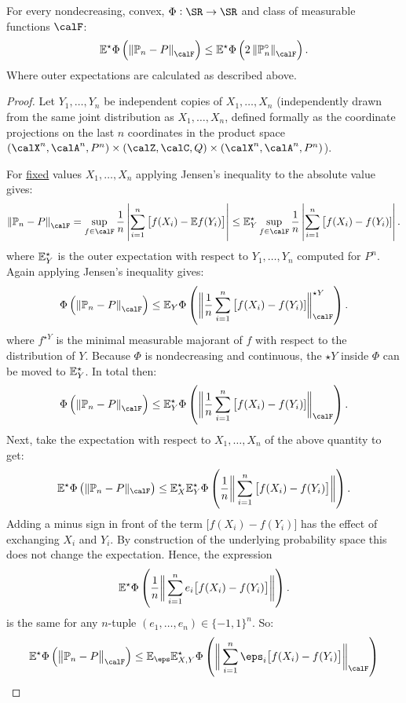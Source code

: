 \begin{lemma}[Symmetrization]
	\label{lemma:vdv2.3.1}
	For every nondecreasing, convex, \(\Phi:\SR\to\SR\) and class of measurable functions \(\calF\):
	\[
	    \E^\star\Phi\left(\left\|\P_n-P\right\|_\calF\right)\leq \E^\star\Phi\left(2\left\|\P_n^\circ\right\|_\calF\right)
	.\]
	Where outer expectations are calculated as described above.
\end{lemma}
\begin{proof}
	Let \(Y_1,\dots,Y_n\) be independent copies of \(X_1,\dots,X_n\) (independently drawn from the same joint distribution as \(X_1,\dots,X_n\), defined formally as the coordinate projections on the last \(n\) coordinates in the product space  \((\calX^n,\calA^n,P^n)\times(\calZ,\calC,Q)\times(\calX^n,\calA^n,P^n)\)). 

	For \underline{fixed} values \(X_1,\dots,X_n\) applying Jensen's inequality to the absolute value gives:
	\[
		\left\|\P_n-P\right\|_\calF = \sup_{f\in\calF}\frac{1}{n}\left|\sum_{i=1}^n \big[f(X_i)-\E f(Y_i)\big]\right|\leq \E^\star_Y \sup_{f\in\calF} \frac{1}{n}\left|\sum_{i=1}^n \big[f(X_i)-f(Y_i)]\right| 
	.\] 
	where \(\mathbb{E}_Y^\star\) is the outer expectation with respect to \(Y_1,\dots,Y_n\) computed for \(P^n\). Again applying Jensen's inequality gives:
	 \[
		 \Phi\left(\left\|\P_n-P\right\|_\calF\right)\leq \E_Y\Phi\left(\bigg\|\frac{1}{n}\sum_{i=1}^n \big[f(X_i)-f(Y_i)] \bigg\|_\calF^{\star Y}\right)
	.\]
	where \(f^{\star Y}\) is the minimal measurable majorant of  \(f\) with respect to the distribution of  \(Y\). Because  \(\Phi\) is nondecreasing and continuous, the  \(\star Y\) inside  \(\Phi\) can be moved to  \(\mathbb{E}^\star_Y\). In total then:	 \[
		\Phi\left(\left\|\P_n-P\right\|_\calF\right)\leq \E_Y^{\star}\Phi\left(\bigg\|\frac{1}{n}\sum_{i=1}^n \big[f(X_i)-f(Y_i)] \bigg\|_\calF\right)
	.\]
	Next, take the expectation with respect to \(X_1,\dots,X_n\) of the above quantity to get:
	\[
		\E^\star\Phi\left(\|\P_n-P\|_\calF\right) \leq \E_X^\star\E_Y^\star\Phi\left(\frac{1}{n}\bigg\|\sum_{i=1}^n \big[f(X_i)-f(Y_i)\big]\bigg\| \right)
	.\]
	Adding a minus sign in front of the term \(\big[f(X_i)-f(Y_i)\big]\) has the effect of exchanging  \(X_i\) and \(Y_i\). By construction of the underlying probability space this does not change the expectation. Hence, the expression
	 \[
	    \mathbb{E}^\star\Phi\left(\frac{1}{n}\bigg\|\sum_{i=1}^n e_i\big[f(X_i)-f(Y_i)\big]\bigg\| \right)
	.\]
	is the same for any \(n\)-tuple  \((e_1,\dots,e_n)\in\{-1,1\}^n\). So:
	\[
		\E^\star\Phi\left(\big\|\P_n-P\big\|_\calF\right)\leq \E_\eps\E^\star_{X,Y}\Phi\left(\bigg\|\sum_{i=1}^n \eps_i\big[f(X_i)-f(Y_i)\big]\bigg\|_\calF\right)
\]
\end{proof}
